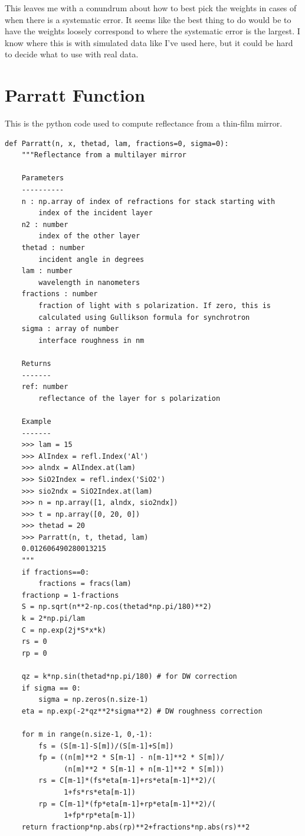 \documentclass[english]{scrartcl}
\begin{document}
This leaves me with a conundrum about how to best pick the weights
in cases of when there is a systematic error. It seems like the best
thing to do would be to have the weights loosely correspond to where
the systematic error is the largest. I know where this is with simulated
data like I've used here, but it could be hard to decide what to
use with real data.

\appendix

\section{Parratt Function\label{sec:Parratt-py}}
This is the python code used to compute reflectance from a thin-film
mirror.
\begin{lstlisting}
def Parratt(n, x, thetad, lam, fractions=0, sigma=0):
    """Reflectance from a multilayer mirror
    
    Parameters
    ----------
    n : np.array of index of refractions for stack starting with 
        index of the incident layer
    n2 : number
        index of the other layer
    thetad : number
        incident angle in degrees
    lam : number
        wavelength in nanometers
    fractions : number
        fraction of light with s polarization. If zero, this is
        calculated using Gullikson formula for synchrotron
    sigma : array of number
        interface roughness in nm
        
    Returns
    -------
    ref: number
        reflectance of the layer for s polarization
        
    Example
    -------
    >>> lam = 15
    >>> AlIndex = refl.Index('Al')
    >>> alndx = AlIndex.at(lam)
    >>> SiO2Index = refl.index('SiO2')
    >>> sio2ndx = SiO2Index.at(lam)
    >>> n = np.array([1, alndx, sio2ndx])
    >>> t = np.array([0, 20, 0])
    >>> thetad = 20
    >>> Parratt(n, t, thetad, lam)
    0.012606490280013215
    """
    if fractions==0:
        fractions = fracs(lam)
    fractionp = 1-fractions
    S = np.sqrt(n**2-np.cos(thetad*np.pi/180)**2)
    k = 2*np.pi/lam
    C = np.exp(2j*S*x*k)
    rs = 0
    rp = 0
    
    qz = k*np.sin(thetad*np.pi/180) # for DW correction
    if sigma == 0:
        sigma = np.zeros(n.size-1)
    eta = np.exp(-2*qz**2*sigma**2) # DW roughness correction
    
    for m in range(n.size-1, 0,-1):
        fs = (S[m-1]-S[m])/(S[m-1]+S[m])
        fp = ((n[m]**2 * S[m-1] - n[m-1]**2 * S[m])/
              (n[m]**2 * S[m-1] + n[m-1]**2 * S[m]))
        rs = C[m-1]*(fs*eta[m-1]+rs*eta[m-1]**2)/(
              1+fs*rs*eta[m-1])
        rp = C[m-1]*(fp*eta[m-1]+rp*eta[m-1]**2)/(
              1+fp*rp*eta[m-1])
    return fractionp*np.abs(rp)**2+fractions*np.abs(rs)**2
     
\end{lstlisting}
\end{document}
